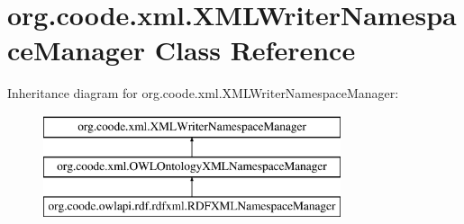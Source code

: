 \hypertarget{classorg_1_1coode_1_1xml_1_1_x_m_l_writer_namespace_manager}{\section{org.\-coode.\-xml.\-X\-M\-L\-Writer\-Namespace\-Manager Class Reference}
\label{classorg_1_1coode_1_1xml_1_1_x_m_l_writer_namespace_manager}
}
Inheritance diagram for org.\-coode.\-xml.\-X\-M\-L\-Writer\-Namespace\-Manager\-:\begin{figure}[H]
\begin{center}
\leavevmode
\includegraphics[height=3.000000cm]{classorg_1_1coode_1_1xml_1_1_x_m_l_writer_namespace_manager}
\end{center}
\end{figure}
